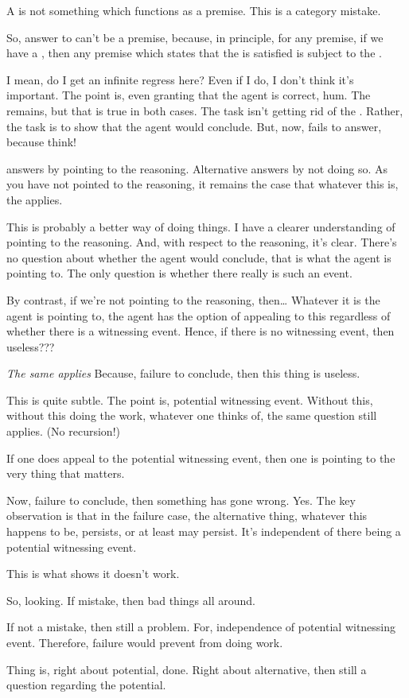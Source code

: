 \begin{note}
  A \fc{} is not something which functions as a premise.
  This is a category mistake.

  So, answer to \qzS{} can't be a premise, because, in principle, for any premise, if we have a \requ{}, then any premise which states that the \requ{} is satisfied is subject to the \requ{}.

  I mean, do I get an infinite regress here?
  Even if I do, I don't think it's important.
  The point is, even granting that the agent is correct, hum.
  The \requ{} remains, but that is true in both cases.
  The task isn't getting rid of the \requ{}.
  Rather, the task is to show that the agent would conclude.
  But, now, fails to answer, because think!

  \fc{} answers by pointing to the reasoning.
  Alternative answers by not doing so.
  As you have not pointed to the reasoning, it remains the case that whatever this is, the \requ{} applies.

  This is probably a better way of doing things.
  I have a clearer understanding of pointing to the reasoning.
  And, with respect to the reasoning, it's clear.
  There's no question about whether the agent would conclude, that is what the agent is pointing to.
  The only question is whether there really is such an event.

  By contrast, if we're not pointing to the reasoning, then\dots
  Whatever it is the agent is pointing to, the agent has the option of appealing to this regardless of whether there is a witnessing event.
  Hence, if there is no witnessing event, then useless???

  \emph{The same \requ{} applies}
  Because, failure to conclude, then this thing is useless.

  This is quite subtle.
  The point is, potential witnessing event.
  Without this, without this doing the work, whatever one thinks of, the same question still applies.
  (No recursion!)

  If one does appeal to the potential witnessing event, then one is pointing to the very thing that matters.

  Now, failure to conclude, then something has gone wrong.
  Yes.
  The key observation is that in the failure case, the alternative thing, whatever this happens to be, persists, or at least may persist.
  It's independent of there being a potential witnessing event.

  This is what shows it doesn't work.

  So, looking.
  If mistake, then bad things all around.

  If not a mistake, then still a problem.
  For, independence of potential witnessing event.
  Therefore, failure would prevent from doing work.

  Thing is, right about potential, done.
  Right about alternative, then still a question regarding the potential.
\end{note}

